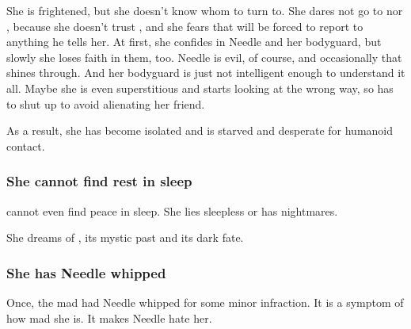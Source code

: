 She is frightened, but she doesn't know whom to turn to. 
She dares not go to \Psyrex{} nor \Icor, because she doesn't trust \Psyrex, and she fears that \Icor{} will be forced to report to \Psyrex{} anything he tells her. 
At first, she confides in Needle and her bodyguard, but slowly she loses faith in them, too. 
Needle is evil, of course, and occasionally that shines through. 
And her bodyguard is just not intelligent enough to understand it all. 
Maybe she is even superstitious and starts looking at \Tiroco{} the wrong way, so \Tiroco{} has to shut up to avoid alienating her friend.

As a result, she has become isolated and is starved and desperate for humanoid contact. 





\subsubsection{She cannot find rest in sleep}
\Tiroco{} cannot even find peace in sleep. 
She lies sleepless or has nightmares. 


She dreams of \Malcur, its mystic past and its dark fate. 






\subsubsection{She has Needle whipped}
Once, the mad \Tiroco{} had Needle whipped for some minor infraction. 
It is a symptom of how mad she is. 
It makes Needle hate her. 

